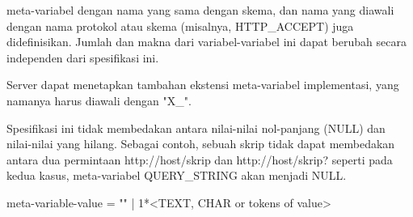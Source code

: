 \documentclass{article}
\begin{document}
meta-variabel dengan nama yang sama dengan skema, dan nama yang diawali
dengan nama protokol atau skema (misalnya, HTTP_ACCEPT) juga
didefinisikan. Jumlah dan makna dari variabel-variabel ini dapat berubah
secara independen dari spesifikasi ini.

Server dapat menetapkan tambahan ekstensi meta-variabel implementasi, yang namanya harus diawali dengan "X_".

Spesifikasi ini tidak membedakan antara nilai-nilai nol-panjang (NULL) dan nilai-nilai yang hilang. Sebagai contoh, sebuah skrip tidak dapat membedakan antara dua permintaan http://host/skrip dan http://host/skrip?  seperti pada kedua kasus, meta-variabel QUERY_STRING akan menjadi NULL.

meta-variable-value = "" | 1*<TEXT, CHAR or tokens of value>
\end{document}
